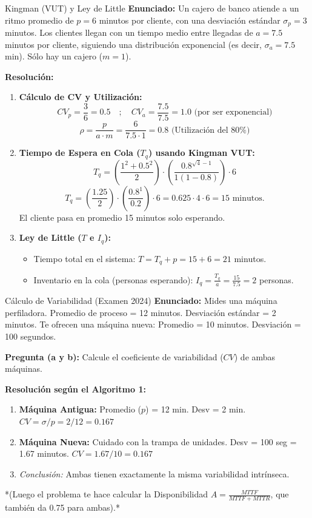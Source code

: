 \vspace{0.4cm}
\begin{ejercicio}{Kingman (VUT) y Ley de Little}
\textbf{Enunciado:} Un cajero de banco atiende a un ritmo promedio de $p = 6$ minutos por cliente, con una desviación estándar $\sigma_p = 3$ minutos. Los clientes llegan con un tiempo medio entre llegadas de $a = 7.5$ minutos por cliente, siguiendo una distribución exponencial (es decir, $\sigma_a = 7.5$ min). Sólo hay un cajero ($m=1$).

\textbf{Resolución:}
\begin{enumerate}
    \item \textbf{Cálculo de CV y Utilización:}
    $$ CV_p = \frac{3}{6} = 0.5 \quad ; \quad CV_a = \frac{7.5}{7.5} = 1.0 \text{ (por ser exponencial)} $$
    $$ \rho = \frac{p}{a \cdot m} = \frac{6}{7.5 \cdot 1} = 0.8 \text{ (Utilización del 80\%)} $$
    \item \textbf{Tiempo de Espera en Cola ($T_q$) usando Kingman VUT:}
    $$ T_q = \left( \frac{1^2 + 0.5^2}{2} \right) \cdot \left( \frac{0.8^{\sqrt{4}-1}}{1(1-0.8)} \right) \cdot 6 $$
    $$ T_q = \left( \frac{1.25}{2} \right) \cdot \left( \frac{0.8^1}{0.2} \right) \cdot 6 = 0.625 \cdot 4 \cdot 6 = 15 \text{ minutos.} $$
    El cliente pasa en promedio 15 minutos solo esperando.
    \item \textbf{Ley de Little ($T$ e $I_q$):}
    \begin{itemize}
        \item Tiempo total en el sistema: $T = T_q + p = 15 + 6 = 21$ minutos.
        \item Inventario en la cola (personas esperando): $I_q = \frac{T_q}{a} = \frac{15}{7.5} = 2$ personas.
    \end{itemize}
\end{enumerate}
\end{ejercicio}

\vspace{0.4cm}
\begin{ejercicio}{Cálculo de Variabilidad (Examen 2024)}
\textbf{Enunciado:} Mides una máquina perfiladora. Promedio de proceso = 12 minutos. Desviación estándar = 2 minutos.
Te ofrecen una máquina nueva: Promedio = 10 minutos. Desviación = 100 segundos.

\textbf{Pregunta (a y b):} Calcule el coeficiente de variabilidad ($CV$) de ambas máquinas.

\textbf{Resolución según el Algoritmo 1:}
\begin{enumerate}
    \item \textbf{Máquina Antigua:}
    Promedio ($p$) = 12 min. Desv = 2 min.
    $CV = \sigma / p = 2 / 12 = 0.167$
    \item \textbf{Máquina Nueva:}
    Cuidado con la trampa de unidades. Desv = 100 seg = 1.67 minutos.
    $CV = 1.67 / 10 = 0.167$
    \item \textit{Conclusión:} Ambas tienen exactamente la misma variabilidad intrínseca.
\end{enumerate}
*(Luego el problema te hace calcular la Disponibilidad $A = \frac{MTTF}{MTTF + MTTR}$, que también da 0.75 para ambas).*
\end{ejercicio}
